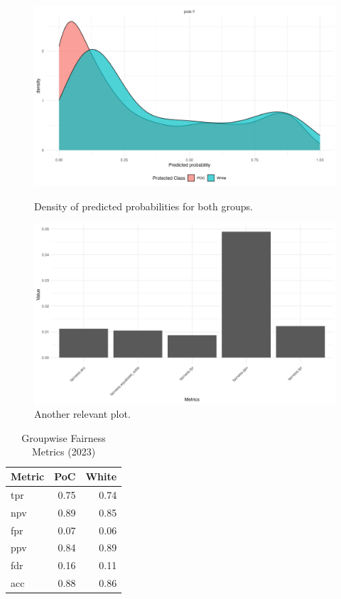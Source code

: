 \begin{figure}
    \centering
    \begin{minipage}{0.48\textwidth}
        \centering
        \includegraphics[width=\textwidth]{../figures/sqf_case_study_plot1.png}
        \caption{Density of predicted probabilities for both groups.}
        \label{fig:fairness_density}
    \end{minipage}
    \hfill
    \begin{minipage}{0.48\textwidth}
        \centering
        \includegraphics[width=\textwidth]{../figures/sqf_case_study_plot2.png}
        \caption{Another relevant plot.}
        \label{fig:fairness_metrics}
    \end{minipage}
\end{figure}

\begin{table}[ht]
  \centering
  \begin{tabular}{lrr}
    \hline
  Metric & PoC & White \\ 
    \hline
  tpr & 0.75 & 0.74 \\ 
    npv & 0.89 & 0.85 \\ 
    fpr & 0.07 & 0.06 \\ 
    ppv & 0.84 & 0.89 \\ 
    fdr & 0.16 & 0.11 \\ 
    acc & 0.88 & 0.86 \\ 
     \hline
  \end{tabular}
  \caption{Groupwise Fairness Metrics (2023)} 
  \label{tab:groupwise_metrics_2023}
\end{table}


